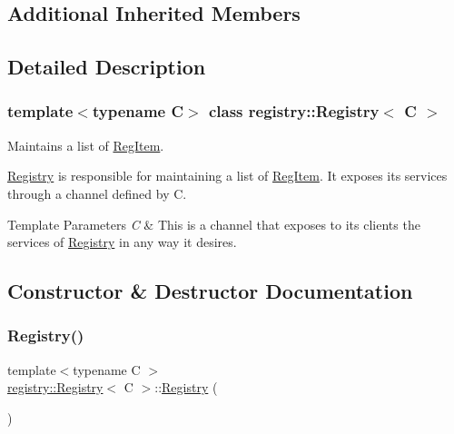 \subsection*{Additional Inherited Members}


\subsection{Detailed Description}
\subsubsection*{template$<$typename C$>$\newline
class registry\+::\+Registry$<$ C $>$}

Maintains a list of \hyperlink{classregistry_1_1RegItem}{Reg\+Item}. 

\hyperlink{classregistry_1_1Registry}{Registry} is responsible for maintaining a list of \hyperlink{classregistry_1_1RegItem}{Reg\+Item}. It exposes its services through a channel defined by C.


\begin{DoxyTemplParams}{Template Parameters}
{\em C} & This is a channel that exposes to its clients the services of \hyperlink{classregistry_1_1Registry}{Registry} in any way it desires. \\
\hline
\end{DoxyTemplParams}


\subsection{Constructor \& Destructor Documentation}
\mbox{\label{classregistry_1_1Registry_af21c2f4bde1c2fdcd4d77da773ec570c}} 
\subsubsection{\texorpdfstring{Registry()}{Registry()}\hspace{0.1cm}{\footnotesize\ttfamily [1/5]}}
{\footnotesize\ttfamily template$<$typename C $>$ \\
\hyperlink{classregistry_1_1Registry}{registry\+::\+Registry}$<$ C $>$\+::\hyperlink{classregistry_1_1Registry}{Registry} (\begin{DoxyParamCaption}{ }\end{DoxyParamCaption})\hspace{0.3cm}{\ttfamily [noexcept]}}


